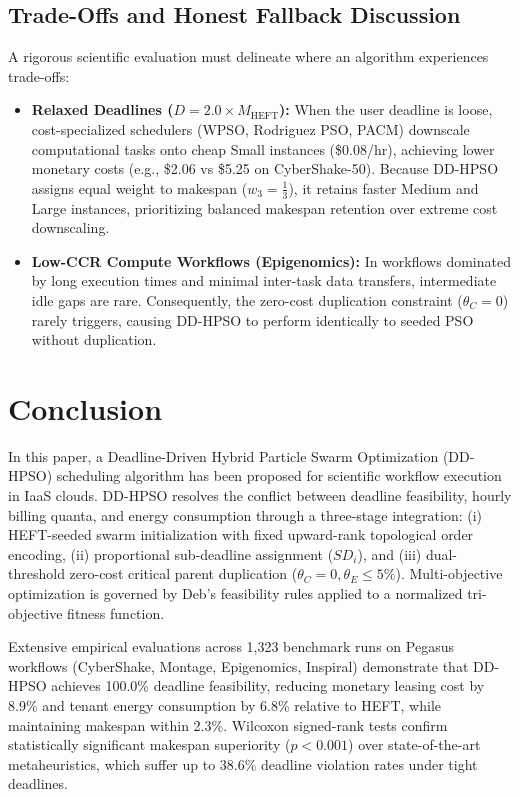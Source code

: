 \documentclass[journal]{IEEEtran}
\begin{document}
\subsection{Trade-Offs and Honest Fallback Discussion}
A rigorous scientific evaluation must delineate where an algorithm experiences trade-offs:
\begin{itemize}
    \item \textbf{Relaxed Deadlines ($D = 2.0 \times M_{\text{HEFT}}$):} When the user deadline is loose, cost-specialized schedulers (WPSO, Rodriguez PSO, PACM) downscale computational tasks onto cheap Small instances (\$0.08/hr), achieving lower monetary costs (e.g., \$2.06 vs \$5.25 on CyberShake-50). Because DD-HPSO assigns equal weight to makespan ($w_3 = \frac{1}{3}$), it retains faster Medium and Large instances, prioritizing balanced makespan retention over extreme cost downscaling.
    \item \textbf{Low-CCR Compute Workflows (Epigenomics):} In workflows dominated by long execution times and minimal inter-task data transfers, intermediate idle gaps are rare. Consequently, the zero-cost duplication constraint ($\theta_C = 0$) rarely triggers, causing DD-HPSO to perform identically to seeded PSO without duplication.
\end{itemize}

\section{Conclusion}
In this paper, a Deadline-Driven Hybrid Particle Swarm Optimization (DD-HPSO) scheduling algorithm has been proposed for scientific workflow execution in IaaS clouds. DD-HPSO resolves the conflict between deadline feasibility, hourly billing quanta, and energy consumption through a three-stage integration: (i) HEFT-seeded swarm initialization with fixed upward-rank topological order encoding, (ii) proportional sub-deadline assignment ($SD_i$), and (iii) dual-threshold zero-cost critical parent duplication ($\theta_C = 0, \theta_E \le 5\%$). Multi-objective optimization is governed by Deb's feasibility rules applied to a normalized tri-objective fitness function.

Extensive empirical evaluations across 1,323 benchmark runs on Pegasus workflows (CyberShake, Montage, Epigenomics, Inspiral) demonstrate that DD-HPSO achieves 100.0\% deadline feasibility, reducing monetary leasing cost by 8.9\% and tenant energy consumption by 6.8\% relative to HEFT, while maintaining makespan within 2.3\%. Wilcoxon signed-rank tests confirm statistically significant makespan superiority ($p < 0.001$) over state-of-the-art metaheuristics, which suffer up to 38.6\% deadline violation rates under tight deadlines.
\end{document}
